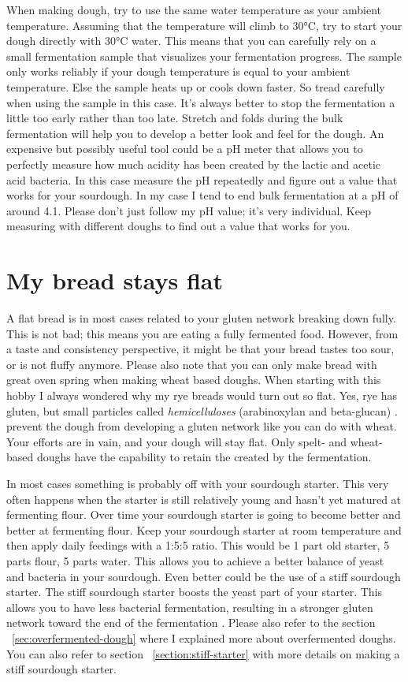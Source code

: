 When making dough, try to use the same water temperature
as your ambient temperature. Assuming that the temperature
will climb to 30°C, try to start your dough directly
with 30°C water. This means that you can carefully rely on
a small fermentation sample that visualizes your fermentation
progress. The sample only works reliably if your dough temperature
is equal to your ambient temperature. Else the sample heats
up or cools down faster. So tread carefully when using
the sample in this case. It's always better to stop
the fermentation a little too early rather than too late.
Stretch and folds during the bulk fermentation
will help you to develop a better look and feel for
the dough. An expensive but possibly useful tool
could be a pH meter that allows you to perfectly
measure how much acidity has been created by the
lactic and acetic acid bacteria. In this case measure
the pH repeatedly and figure out a value that works
for your sourdough. In my case I tend to end bulk
fermentation at a pH of around 4.1. Please don't just
follow my pH value; it's very individual. Keep measuring
with different doughs to find out a value that works for you.

\section{My bread stays flat}

A flat bread is in most cases related to your gluten
network breaking down fully. This is not bad; this
means you are eating a fully fermented food. However,
from a taste and consistency perspective, it might be
that your bread tastes too sour, or is not fluffy anymore.
Please also note that you can only make bread with
great oven spring when making wheat based doughs. When
starting with this hobby I always wondered why my rye
breads would turn out so flat. Yes, rye has gluten, but
small particles called {\it hemicelluloses} (arabinoxylan and beta-glucan) \cite{rye-defects}.
prevent the dough from developing a gluten network like you can
do with wheat. Your efforts are in vain, and your dough will
stay flat. Only spelt- and wheat-based doughs have the capability
to retain the  created by the fermentation.

In most cases something is probably off with your
sourdough starter. This very often happens when the starter
is still relatively young and hasn't yet matured
at fermenting flour. Over time your sourdough
starter is going to become better and better at fermenting
flour. Keep your sourdough starter at room temperature
and then apply daily feedings with a 1:5:5 ratio.
This would be 1 part old starter, 5 parts flour,
5 parts water. This allows you to achieve a better
balance of yeast and bacteria in your sourdough.
Even better could be the use of a stiff sourdough
starter. The stiff sourdough starter boosts
the yeast part of your starter. This allows you
to have less bacterial fermentation, resulting
in a stronger gluten network toward the end
of the fermentation \cite{stiff+starter}. Please
also refer to the section ~\ref{sec:overfermented-dough} where
I explained more about overfermented doughs. You can also
refer to section ~\ref{section:stiff-starter} with more details on
making a stiff sourdough starter.

